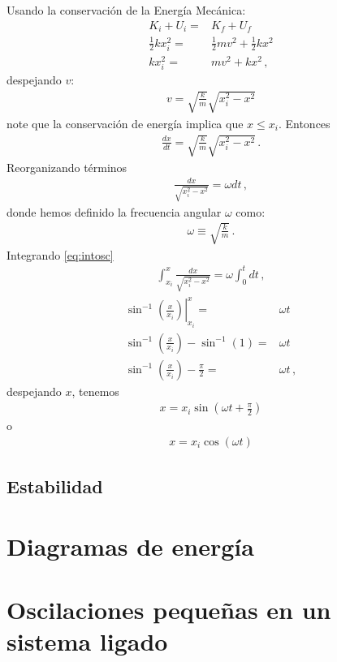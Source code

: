 Usando la conservación de la Energía Mecánica:
\begin{align}
  K_i+U_i=&K_f+U_f\nonumber\\
 \tfrac{1}{2}kx_i^2=&\tfrac{1}{2}m v^2+\tfrac{1}{2}kx^2\nonumber\\
 kx_i^2=&m v^2+kx^2\,,
\end{align}
despejando $v$:
\begin{align}
  v=\sqrt{\frac{k}{m}}\sqrt{x_i^2-x^2}
\end{align}
note que la conservación de energía implica que $x\le x_i$. Entonces
\begin{align}
  \frac{dx}{dt}=\sqrt{\frac{k}{m}}\sqrt{x_i^2-x^2}\,.
\end{align}
Reorganizando términos
\begin{align}
  \label{eq:intosc}
  \frac{dx}{\sqrt{x_i^2-x^2}}=\omega dt\,,
\end{align}
donde hemos definido la frecuencia angular $\omega$ como:
\begin{align}
  \omega\equiv \sqrt{\frac{k}{m}}\,.
\end{align}
Integrando \eqref{eq:intosc}
\begin{align}
  \label{eq:intosc}
  \int_{x_i}^x\frac{dx}{\sqrt{x_i^2-x^2}}=\omega\int_0^t dt\,,
\end{align}
\begin{align}
\left.\sin^{-1}\left(\frac{x}{x_i}  \right)\right|_{x_i}^x=&\omega t\nonumber\\
\sin^{-1}\left(\frac{x}{x_i} \right)-\sin^{-1}\left(1\right)=&\omega t\nonumber\\
\sin^{-1}\left(\frac{x}{x_i} \right)-\frac{\pi}{2}=&\omega t\,,
\end{align}
despejando $x$, tenemos
\begin{align}
  x=x_i\sin\left(\omega t +\frac{\pi}{2}\right)
\end{align}
o
\begin{align}
  x=x_i\cos(\omega t)
\end{align}

  


\begin{inprogress}
  \subsection{Estabilidad}

\section{Diagramas de energía}

\section{Oscilaciones pequeñas en un sistema ligado}

\end{inprogress}


